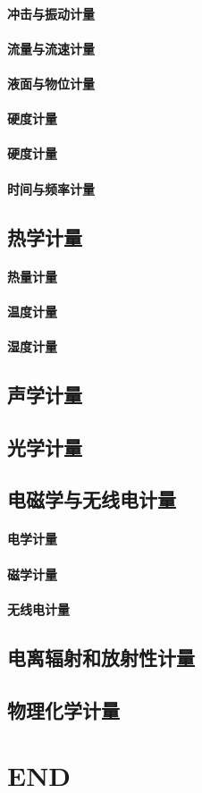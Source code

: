 \documentclass[UTF8]{../../ApplicationUniverse}
\begin{document}
    \subsubsection{冲击与振动计量}
    \subsubsection{流量与流速计量}
    \subsubsection{液面与物位计量}
    \subsubsection{硬度计量}
    \subsubsection{硬度计量}
    \subsubsection{时间与频率计量}
\section{热学计量}
    \subsubsection{热量计量}
    \subsubsection{温度计量}
    \subsubsection{湿度计量}
\section{声学计量}
\section{光学计量}
\section{电磁学与无线电计量}
    \subsubsection{电学计量}
    \subsubsection{磁学计量}
    \subsubsection{无线电计量}
\section{电离辐射和放射性计量}
\section{物理化学计量}

\chapter{END}
\end{document}
